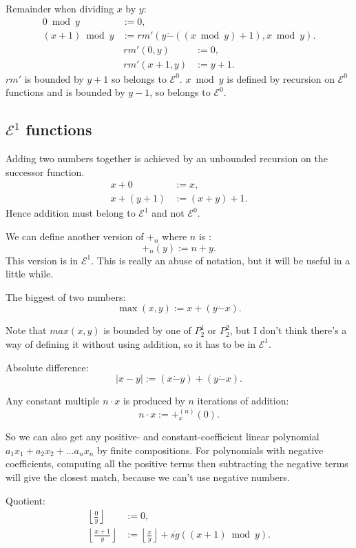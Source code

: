 \documentclass[a4paper]{article}
\newcommand{\grz}[1]{$\mathcal{E}^{#1}$}	%
\newcommand{\psub}{\dot -}	%
\newcommand{\rsg}{\overline{sg}} %
\newcommand{\recur}[1]{\begin{equation} \begin{split} #1 \end{split} \end{equation}}	%
\newcommand{\recurN}[1]{\begin{equation*} \begin{split} #1 \end{split} \end{equation*}}	%
\theoremstyle{plain}
\theoremstyle{definition}
\begin{document}
Remainder when dividing $x$ by $y$:
\recur{
	0 \bmod{y} &:= 0,	\\
	(x+1) \bmod{y} &:= rm' \left( y \psub \left( (x \bmod{y}) + 1 \right), x \bmod{y} \right).
	}
\recurN{
	rm'(0,y) &:= 0, 	\\
	rm'(x+1,y) &:= y+1.
}
$rm'$ is bounded by $y+1$ so belongs to \grz{0}. $x \bmod{y}$ is defined by recursion on \grz{0} functions and is bounded by $y-1$, so belongs to \grz{0}.

\subsection{\grz{1} functions}
Adding two numbers together is achieved by an unbounded recursion on the successor function.
\recur{
	x + 0 &:= x,			\\
	x + (y+1) &:= (x+y) + 1.
}
Hence addition must belong to \grz{1} and not \grz{0}.

We can define another version of $+_n$ where $n$ is :
\begin{equation} +_n(y) := n + y. \end{equation}
This version is in \grz{1}. This is really an abuse of notation, but it will be useful in a little while.

The biggest of two numbers:
\begin{equation} \max(x,y) := x + (y \psub x). \end{equation}

Note that $max(x,y)$ is bounded by one of $P_2^1$ or $P_2^2$, but I don't think there's a way of defining it without using addition, so it has to be in \grz{1}.

Absolute difference:
\begin{equation} |x - y| := (x \psub y) + (y \psub x). \end{equation}

Any constant multiple $n \cdot x$ is produced by $n$ iterations of addition:
\begin{equation} n \cdot x := +_x^{(n)}(0). \end{equation}

So we can also get any positive- and constant-coefficient linear polynomial $a_1x_1 + a_2x_2 + \dots a_nx_n$ by finite compositions. For polynomials with negative coefficients, computing all the positive terms then subtracting the negative terms will give the closest match, because we can't use negative numbers.

Quotient:
\recur{
	\left \lfloor \frac{0}{y} \right \rfloor &:= 0, \\
	\left \lfloor \frac{x+1}{y} \right \rfloor &:= \left \lfloor \frac{x}{y} \right \rfloor + \rsg\left( (x+1) \bmod{y} \right).
}
\end{document}

